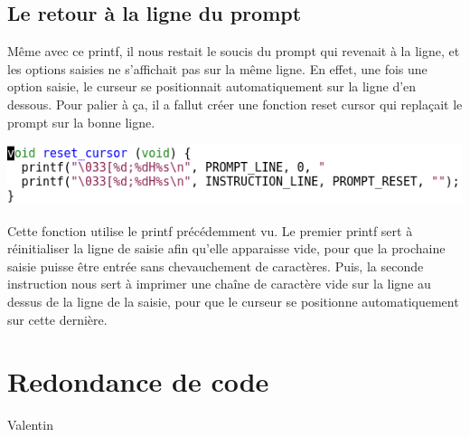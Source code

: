 \documentclass{article}
\begin{document}
\subsection {Le retour à la ligne du prompt}
Même avec ce printf, il nous restait le soucis du prompt qui revenait à la ligne, et les options saisies ne s'affichait pas sur la même ligne. En effet, une fois une option saisie, le curseur se positionnait automatiquement sur la ligne d'en dessous. Pour palier à ça, il a fallut créer une fonction reset cursor qui replaçait le prompt sur la bonne ligne.

\begin{flushleft}
\includegraphics[scale=0.45]{reset_cursor.png}
\end{flushleft}

Cette fonction utilise le printf précédemment vu. Le premier printf sert à réinitialiser la ligne de saisie afin qu'elle apparaisse vide, pour que la prochaine saisie puisse être entrée sans chevauchement de caractères. Puis, la seconde instruction nous sert à imprimer une chaîne de caractère vide sur la ligne au dessus de la ligne de la saisie, pour que le curseur se positionne automatiquement sur cette dernière.

\section {Redondance de code}
Valentin
\end{document}
